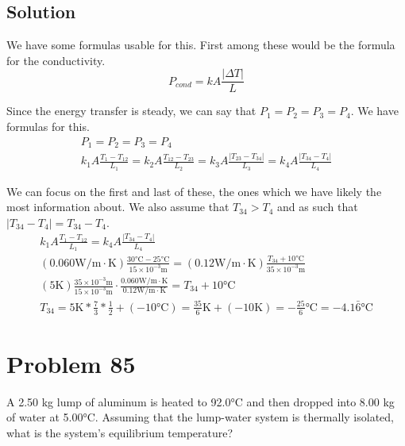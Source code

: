 \documentclass[12pt]{article}
\begin{document}
        \subsection{Solution}
            We have some formulas usable for this.
            First among these would be the formula for the conductivity. 
            \begin{equation}
                P_{cond}    =   kA\frac{\left| \Delta T \right|}{L}
            \end{equation}

            Since the energy transfer is steady, we can say that $P_1 = P_2 = P_3 = P_4$. 
            We have formulas for this.
            \begin{gather}
                P_1 =   P_2 =   P_3 =   P_4\\
                k_1A\frac{T_1 - T_{12}}{L_1}    =   k_2A\frac{T_{12} - T_{23}}{L_2} =   k_3A\frac{\left| T_{23} - T_{34} \right|}{L_3}  =   k_4A\frac{\left| T_{34} - T_4 \right|}{L_4}
            \end{gather}

            We can focus on the first and last of these, the ones which we have likely the most information about.
            We also assume that $T_{34} > T_4$ and as such that $\left| T_{34} - T_4 \right| = T_{34} - T_4$. 
            \begin{gather}
                k_1A\frac{T_1 - T_{12}}{L_1}    =   k_4A\frac{\left| T_{34} - T_4 \right|}{L_4}\\
                (0.060 \unit{\watt/\meter\cdot\kelvin}) \frac{30 \unit{\celsius} - 25 \unit{\celsius}}{15 \times 10^{-3} \unit{\meter}}
                    =   (0.12 \unit{\watt/\meter\cdot\kelvin}) \frac{T_{34} + 10 \unit{\celsius}}{35 \times 10^{-3} \unit{\meter}}\\
                (5 \unit{\kelvin})\frac{35 \times 10^{-3} \unit{\meter}}{15 \times 10^{-3} \unit{\meter}} \cdot \frac{0.060 \unit{\watt/\meter\cdot\kelvin}}{0.12 \unit{\watt/\meter\cdot\kelvin}}
                    =   T_{34} + 10 \unit{\celsius}\\
                T_{34}  =   5 \unit{\kelvin} * \frac{7}{3} * \frac{1}{2} + (-10 \unit{\celsius})
                    =   \frac{35}{6} \unit{\kelvin} + (-10 \unit{\kelvin})
                    =   \boxed{-\frac{25}{6} \unit{\celsius} = -4.1\bar{6} \unit{\celsius}}
            \end{gather} 

    \pagebreak
    \section{Problem 85}
        A 2.50 kg lump of aluminum is heated to 92.0°C and then dropped into 8.00 kg of water at 5.00°C. 
        Assuming that the lump-water system is thermally isolated, what is the system's equilibrium temperature?
\end{document}
